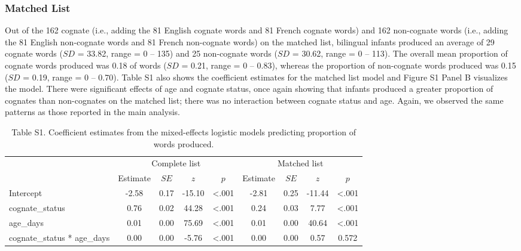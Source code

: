 \documentclass[
  ,man,floatsintext]{apa6}
\begin{document}
\hypertarget{matched-list}{%
\subsubsection{Matched List}\label{matched-list}}

Out of the 162 cognate (i.e., adding the 81 English cognate words and 81 French cognate words) and 162 non-cognate words (i.e., adding the 81 English non-cognate words and 81 French non-cognate words) on the matched list, bilingual infants produced an average of 29 cognate words (\(SD\) = 33.82, range = 0 -- 135) and 25 non-cognate words (\(SD\) = 30.62, range = 0 -- 113). The overall mean proportion of cognate words produced was 0.18 of words (\(SD\) = 0.21, range = 0 -- 0.83), whereas the proportion of non-cognate words produced was 0.15 (\(SD\) = 0.19, range = 0 -- 0.70). Table S1 also shows the coefficient estimates for the matched list model and Figure S1 Panel B visualizes the model. There were significant effects of age and cognate status, once again showing that infants produced a greater proportion of cognates than non-cognates on the matched list; there was no interaction between cognate status and age. Again, we observed the same patterns as those reported in the main analysis.

\begin{table}[H]

\begin{center}
\begin{threeparttable}

\caption{\label{tab:Table S1}Table S1. Coefficient estimates from the mixed-effects logistic models predicting proportion of words produced.}

\begin{tabular}{lcccccccc}
\toprule
 & \multicolumn{4}{c}{Complete list} & \multicolumn{4}{c}{Matched list} \\
\cmidrule(r){2-5} \cmidrule(r){6-9}
 & Estimate & $SE$ & $z$ & $p$ & Estimate & $SE$ & $z$ & $p$\\
\midrule
Intercept & -2.58 & 0.17 & -15.10 & <.001 & -2.81 & 0.25 & -11.44 & <.001\\
cognate\_status & 0.76 & 0.02 & 44.28 & <.001 & 0.24 & 0.03 & 7.77 & <.001\\
age\_days & 0.01 & 0.00 & 75.69 & <.001 & 0.01 & 0.00 & 40.64 & <.001\\
cognate\_status * age\_days & 0.00 & 0.00 & -5.76 & <.001 & 0.00 & 0.00 & 0.57 & 0.572\\
\bottomrule
\end{tabular}

\end{threeparttable}
\end{center}

\end{table}
\end{document}
